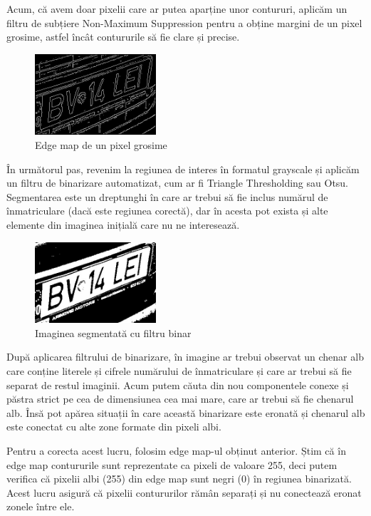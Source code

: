 \documentclass[a4paper,12pt]{report}
\begin{document}
Acum, că avem doar pixelii care ar putea aparține unor contururi, aplicăm un filtru de subțiere Non-Maximum Suppression pentru a obține margini de un pixel grosime, astfel încât contururile să fie clare și precise.

\begin{figure}[h]
    \centering
    \includegraphics[width=0.4\textwidth]{images/non_maximum_suppression.jpg}
    \caption{Edge map de un pixel grosime}
\end{figure}
\FloatBarrier

În următorul pas, revenim la regiunea de interes în formatul grayscale și aplicăm un filtru de binarizare automatizat, cum ar fi Triangle Thresholding sau Otsu. Segmentarea este un dreptunghi în care ar trebui să fie inclus numărul de înmatriculare (dacă este regiunea corectă), dar în acesta pot exista și alte elemente din imaginea inițială care nu ne interesează.

\begin{figure}[h]
    \centering
    \includegraphics[width=0.4\textwidth]{images/before_roi.jpg}
    \caption{Imaginea segmentată cu filtru binar}
\end{figure}
\FloatBarrier

După aplicarea filtrului de binarizare, în imagine ar trebui observat un chenar alb care conține literele și cifrele numărului de înmatriculare și care ar trebui să fie separat de restul imaginii. Acum putem căuta din nou componentele conexe și păstra strict pe cea de dimensiunea cea mai mare, care ar trebui să fie chenarul alb. Însă pot apărea situații în care această binarizare este eronată și chenarul alb este conectat cu alte zone formate din pixeli albi.

Pentru a corecta acest lucru, folosim edge map-ul obținut anterior. Știm că în edge map contururile sunt reprezentate ca pixeli de valoare 255, deci putem verifica că pixelii albi (255) din edge map sunt negri (0) în regiunea binarizată. Acest lucru asigură că pixelii contururilor rămân separați și nu conectează eronat zonele între ele.
\end{document}
